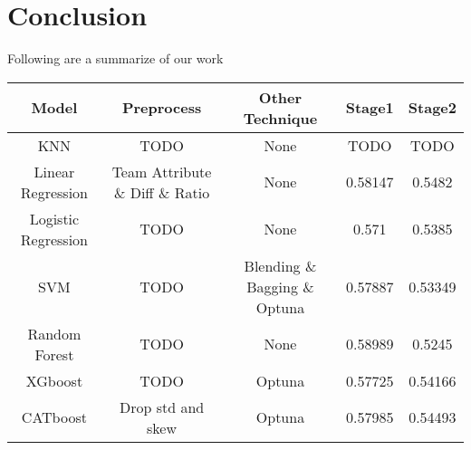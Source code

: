 \section{Conclusion}
Following are a summarize of our work 
\begin{table}[h]
    \centering
    \begin{tabular}{|c|c|c|c|c|}
    \hline
    Model & Preprocess & Other Technique & Stage1 & Stage2 \\ \hline\hline
    KNN   & TODO   & None & TODO & TODO  \\ \hline
    Linear Regression & Team Attribute \& Diff \& Ratio & None & 0.58147 & 0.5482 \\ \hline
    Logistic Regression & TODO & None & 0.571 & 0.5385 \\ \hline
    SVM & TODO & Blending \& Bagging \& Optuna & 0.57887 & 0.53349 \\ \hline
    Random Forest & TODO & None & 0.58989 & 0.5245 \\ \hline
    XGboost & TODO & Optuna & 0.57725 & 0.54166 \\ \hline
    CATboost & Drop std and skew & Optuna & 0.57985 & 0.54493 \\ \hline
    \end{tabular}
    \label{tab:example_table}
\end{table}